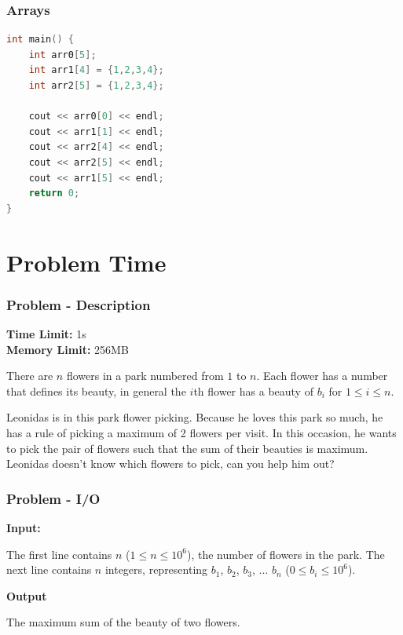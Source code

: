 \documentclass{beamer}
\begin{document}
\begin{frame}[fragile]
	\frametitle{Arrays}

	\begin{lstlisting}[language=C++]
int main() { 
	int arr0[5];
	int arr1[4] = {1,2,3,4};
	int arr2[5] = {1,2,3,4};
 
	cout << arr0[0] << endl;
	cout << arr1[1] << endl;
	cout << arr2[4] << endl;
	cout << arr2[5] << endl;
	cout << arr1[5] << endl;
	return 0;  
}
	\end{lstlisting}
\end{frame}

\section{Problem Time}

\begin{frame}
	\frametitle{Problem - Description}

	\textbf{Time Limit:} 1s \\
	\textbf{Memory Limit:} 256MB

	There are $n$ flowers in a park numbered from $1$ to $n$. Each flower has a number that defines its beauty, in general the $i$th flower has a beauty of $b_i$ for $1 \leq i \leq n$. 
	
	Leonidas is in this park flower picking. Because he loves this park so much, he has a rule of picking a maximum of 2 flowers per visit. In this occasion, he wants to pick the pair of flowers such that the sum of their beauties is maximum. Leonidas doesn't know which flowers to pick, can you help him out?
\end{frame}

\begin{frame}
	\frametitle{Problem - I/O}

	\textbf{Input:}

	The first line contains $n$ ($1 \leq n \leq 10^6$), the number of flowers in the park. The next line contains $n$ integers, representing $b_1$, $b_2$, $b_3$, ... $b_n$  ($0 \leq b_i \leq 10^6$).

	\textbf{Output}

	The maximum sum of the beauty of two flowers.

\end{frame}
\end{document}
